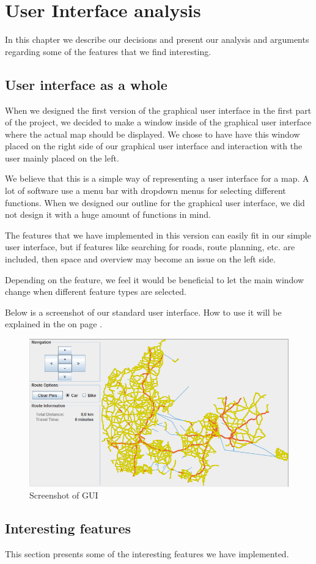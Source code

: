 \chapter{User Interface analysis}
\label{UIA}
In this chapter we describe our decisions and present our analysis and
arguments regarding some of the features that we find interesting.

\section{User interface as a whole}
\label{UIA-UIW}
When we designed the first version of the graphical user interface in the first
part of the project, we decided to make a window inside of the graphical user
interface where the actual map should be displayed. We chose to have have this
window placed on the right side of our graphical user interface and interaction
with the user mainly placed on the left.

We believe that this is a simple way of representing a user interface for a map.
A lot of software use a menu bar with dropdown menus for selecting different
functions. When we designed our outline for the graphical user interface, we did
not design it with a huge amount of functions in mind. 

The features that we have implemented in this version can easily fit in our
simple user interface, but if features like searching for roads, route planning,
etc. are included, then space and overview may become an issue on the left side.

Depending on the feature, we feel it would be beneficial to let the main window
change when different feature types are selected.

Below is a screenshot of our standard user interface. How to use it will be
explained in the  on page \pageref{MAN}.

\begin{figure}[!ht]
\centering
\includegraphics[width=0.5\linewidth]{images/PictureOfUI}
\caption{Screenshot of GUI}
\label{UIA-UIW-PIC}
\end{figure}
\section{Interesting features}
\label{UIA-IF}
This section presents some of the interesting features we have implemented.
